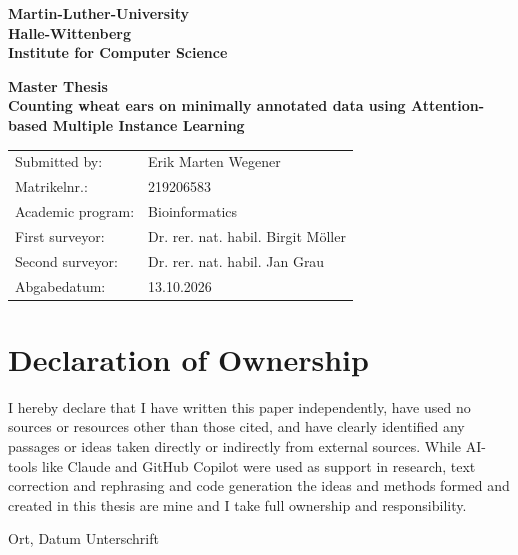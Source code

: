 \documentclass[12pt,parskip = half, DIV=classic,listof=totoc]{scrartcl}
\begin{document}
	\begin{titlepage}
		\centering\bfseries\Large
		Martin-Luther-University\\
		Halle-Wittenberg\\
		\Large\bfseries
		Institute for Computer Science
		
		\centering\vspace{3cm}\huge\bfseries
		Master Thesis\\
		
		\vspace{3cm}\Huge
		Counting wheat ears on minimally annotated data using Attention-based Multiple Instance Learning
		
		\vspace{6cm}\small\raggedright\normalfont
		\begin{tabular}{ll}
		Submitted by: &Erik Marten Wegener\\
		Matrikelnr.: &219206583\\
		Academic program: & Bioinformatics\\
		First surveyor: & Dr. rer. nat. habil. Birgit Möller\\
		Second surveyor: & Dr. rer. nat. habil. Jan Grau\\
		Abgabedatum:  & 13.10.2026
		\end{tabular}
	\end{titlepage}
	\newpage
	\tableofcontents
	\newpage
	\listoffigures
	\newpage
	\listoftables
	\newpage
	\printacronyms
	\newpage
	\thispagestyle{empty}
	\section*{Declaration of Ownership}
	
	I hereby declare that I have written this paper independently, have used no sources or resources other than those cited,
	 and have clearly identified any passages or ideas taken directly or indirectly from external sources. 
	 While AI-tools like Claude and GitHub Copilot were used as support in research, text correction and rephrasing and code generation
	 the ideas and methods formed and created in this thesis are mine and I take full ownership and responsibility.
	\vspace{4cm}
	
	\hspace{2cm} Ort, Datum \hfill Unterschrift \hspace{2cm}
	\newpage
	
\end{document}
